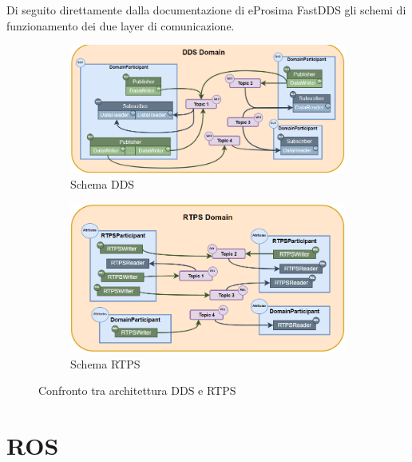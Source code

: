 Di seguito direttamente dalla documentazione di eProsima FastDDS\cite{FastDDS} gli schemi di funzionamento dei due layer di comunicazione.
\begin{figure}[H]
    \centering
    \begin{subfigure}{0.45\linewidth}
      \centering
      \includegraphics[width=\linewidth]{./img/dds_architecture.png}
      \caption{Schema DDS}\label{fig:dds}
    \end{subfigure}
    \begin{subfigure}{0.45\linewidth}
      \centering
      \includegraphics[width=\linewidth]{./img/rtps_architecture.png}
      \caption{Schema RTPS}\label{fig:rtps}
    \end{subfigure}
    \caption{Confronto tra architettura DDS e RTPS}\label{fig:confrontodds_rtps}
  \end{figure}


\section{ROS}\label{SSEC:rosiface}


